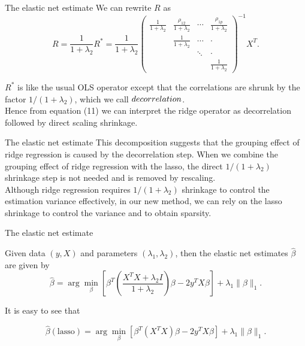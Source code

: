 \begin{frame}{The elastic net estimate}
    We can rewrite \( R \) as
\begin{equation}
   R = \frac{1}{1 + \lambda_2} R^* = \frac{1}{1 + \lambda_2} \begin{pmatrix}
\frac{1}{1+\lambda_2} & \frac{\rho_{12}}{1+\lambda_2} & \cdots & \frac{\rho_{1p}}{1+\lambda_2} \\
 & \frac{1}{1+\lambda_2} & \cdots & \cdot \\
 &  & \ddots & \cdot \\
 &  &  & \frac{1}{1+\lambda_2}
\end{pmatrix}^{-1} X^T. 
\end{equation}

\( R^* \) is like the usual OLS operator except that the correlations are shrunk by the factor \( 1/(1 + \lambda_2) \), which we call $\*decorrelation\*$. \\
\vspace{10pt}
Hence from equation (11) we can interpret the ridge operator as decorrelation followed by direct scaling shrinkage.
\end{frame}

\begin{frame}{The elastic net estimate}
    This decomposition suggests that the grouping effect of ridge regression is caused by the decorrelation step. When we combine the grouping effect of ridge regression with the lasso, the direct \( 1/(1 + \lambda_2) \) shrinkage step is not needed and is removed by rescaling.\\
    \vspace{10pt}
    Although ridge regression requires \( 1/(1 + \lambda_2) \) shrinkage to control the estimation variance effectively, in our new method, we can rely on the lasso shrinkage to control the variance and to obtain sparsity.
\end{frame}

\begin{frame}{The elastic net estimate}
    \begin{theorem}[2]
        Given data \( (y, X) \) and parameters \( (\lambda_1, \lambda_2) \), then the elastic net estimates \( \hat{\beta} \) are given by
\begin{equation}
   \hat{\beta} = \arg\min_{\beta} \left[ \beta^T \left( \frac{X^TX + \lambda_2 I}{1 + \lambda_2} \right) \beta - 2y^T X\beta \right] + \lambda_1 \lVert \beta \rVert_1. 
\end{equation}

It is easy to see that

\begin{equation}
   \hat{\beta}(\text{lasso}) = \arg\min_{\beta} \left[ \beta^T (X^TX) \beta - 2y^T X\beta \right] + \lambda_1 \lVert \beta \rVert_1. 
\end{equation}
    \end{theorem}
\end{frame}


